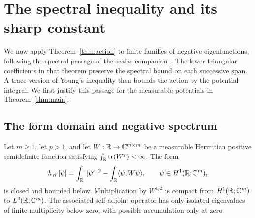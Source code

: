 \section{The spectral inequality and its sharp constant}
\label{sec:spectral}

We now apply Theorem~\ref{thm:action} to finite families of negative
eigenfunctions, following the spectral passage of the scalar
companion~\cite[Section~7]{ScalarCompanion}.  The lower triangular coefficients
in that theorem preserve
the spectral bound on each successive span.  A trace version of Young's
inequality then bounds the action by the potential integral.  We first justify
this passage for the measurable potentials in Theorem~\ref{thm:main}.

\subsection{The form domain and negative spectrum}

\begin{lemma}\label{lem:form-compactness}
Let $m\geq1$, let $p>1$, and let $W:\mathbb R\to\mathbb C^{m\times m}$ be a measurable
Hermitian positive semidefinite function satisfying
$\int_\mathbb R\operatorname{tr}(W^p)<\infty$.  The form
\[
 h_W[\psi]=\int_\mathbb R\|\psi'\|^2
              -\int_\mathbb R\langle\psi,W\psi\rangle,
 \qquad \psi\in H^1(\mathbb R;\mathbb C^m),
\]
is closed and bounded below.  Multiplication by $W^{1/2}$ is compact from
$H^1(\mathbb R;\mathbb C^m)$ to $L^2(\mathbb R;\mathbb C^m)$.  The associated self-adjoint operator has
only isolated eigenvalues of finite multiplicity below zero, with possible
accumulation only at zero.
\end{lemma}

